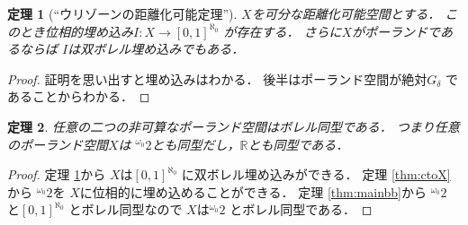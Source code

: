 \documentclass[leqno, 12pt]{jsarticle}
\newtheorem{thm}{定理}
\newcommand{\rr}{\mathbb{R}}
\newcommand{\myomega}{\omega_{0}}
\newcommand{\mycantor}{{}^{\myomega}2}
\begin{document}
\begin{thm}[``ウリゾーンの距離化可能定理'']
\label{thm:ury}
$X$を可分な距離化可能空間とする．
このとき位相的埋め込み$I\colon X\to [0, 1]^{\aleph_{0}}$
が存在する．
さらに$X$がポーランドであるならば
$I$は双ボレル埋め込みでもある．
\end{thm}
\begin{proof}
証明を思い出すと埋め込みはわかる．
後半はポーランド空間が絶対$G_{\delta}$
であることからわかる．
\end{proof}

\begin{thm}\label{thm:XtoX}
任意の二つの非可算なポーランド空間はボレル同型である．
つまり任意のポーランド空間$X$は
$\mycantor$とも同型だし，$\rr$とも同型である．
\end{thm}
\begin{proof}
定理 \ref{thm:ury}から
$X$は$[0, 1]^{\aleph_{0}}$
に双ボレル埋め込みができる．
定理 \ref{thm:ctoX}から
$\mycantor$を
$X$に位相的に埋め込めることができる．
定理 \ref{thm:mainbb}から
$\mycantor$
と$[0, 1]^{\aleph_{0}}$
とボレル同型なので
$X$は$\mycantor$
とボレル同型である．
\end{proof}
\end{document}
